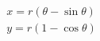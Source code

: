 \documentclass[preview]{standalone}
\begin{document}
\begin{align*}
x = r(\theta - \sin \theta) \\ y = r(1 - \cos \theta)
\end{align*}
\end{document}
